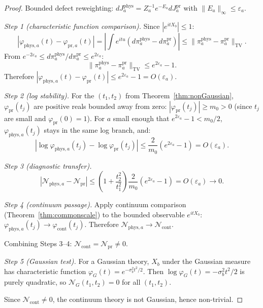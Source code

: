 \documentclass[12pt]{article}
\theoremstyle{plain}
\theoremstyle{definition}
\numberwithin{equation}{section}
\newcommand{\pr}{\mathrm{pr}}
\newcommand{\phys}{\mathrm{phys}}
\begin{document}
\begin{proof}
Bounded defect reweighting: $dJ_a^{\phys}=Z_a^{-1}e^{-E_a}dJ_a^{\pr}$ with $\|E_a\|_\infty\leq\varepsilon_a$.

\emph{Step 1 (characteristic function comparison).}  Since $|e^{itX_b}|\leq 1$:
\begin{equation}
|\varphi_{\phys,a}(t)-\varphi_{\pr,a}(t)| = \left|\int e^{itu}(d\pi_a^{\phys}-d\pi_a^{\pr})\right| \leq \|\pi_a^{\phys}-\pi_a^{\pr}\|_{\mathrm{TV}}.
\end{equation}
From $e^{-2\varepsilon_a}\leq d\pi_a^{\phys}/d\pi_a^{\pr}\leq e^{2\varepsilon_a}$:
\begin{equation}
\|\pi_a^{\phys}-\pi_a^{\pr}\|_{\mathrm{TV}} \leq e^{2\varepsilon_a}-1.
\end{equation}
Therefore $|\varphi_{\phys,a}(t)-\varphi_{\pr}(t)|\leq e^{2\varepsilon_a}-1=O(\varepsilon_a)$.

\emph{Step 2 (log stability).}  For the $(t_1,t_2)$ from Theorem~\ref{thm:nonGaussian}, $\varphi_{\pr}(t_j)$ are positive reals bounded away from zero: $|\varphi_{\pr}(t_j)|\geq m_0>0$ (since $t_j$ are small and $\varphi_{\pr}(0)=1$).  For $a$ small enough that $e^{2\varepsilon_a}-1<m_0/2$, $\varphi_{\phys,a}(t_j)$ stays in the same log branch, and:
\begin{equation}
|\log\varphi_{\phys,a}(t_j)-\log\varphi_{\pr}(t_j)| \leq \frac{2}{m_0}(e^{2\varepsilon_a}-1) = O(\varepsilon_a).
\end{equation}

\emph{Step 3 (diagnostic transfer).}
\begin{equation}
|\mathcal{N}_{\phys,a}-\mathcal{N}_{\pr}| \leq \left(1+\frac{t_2^2}{t_1^2}\right)\frac{2}{m_0}(e^{2\varepsilon_a}-1) = O(\varepsilon_a)\to 0.
\end{equation}

\emph{Step 4 (continuum passage).}  Apply continuum comparison (Theorem~\ref{thm:commonscale}) to the bounded observable $e^{itX_b}$: $\varphi_{\phys,a}(t_j)\to\varphi_{\mathrm{cont}}(t_j)$.  Therefore $\mathcal{N}_{\phys,a}\to\mathcal{N}_{\mathrm{cont}}$.

Combining Steps 3--4: $\mathcal{N}_{\mathrm{cont}}=\mathcal{N}_{\pr}\neq 0$.

\emph{Step 5 (Gaussian test).}  For a Gaussian theory, $X_b$ under the Gaussian measure has characteristic function $\varphi_G(t)=e^{-\sigma_b^2 t^2/2}$.  Then $\log\varphi_G(t)=-\sigma_b^2 t^2/2$ is purely quadratic, so $\mathcal{N}_G(t_1,t_2)=0$ for all $(t_1,t_2)$.

Since $\mathcal{N}_{\mathrm{cont}}\neq 0$, the continuum theory is not Gaussian, hence non-trivial.
\end{proof}
\end{document}
